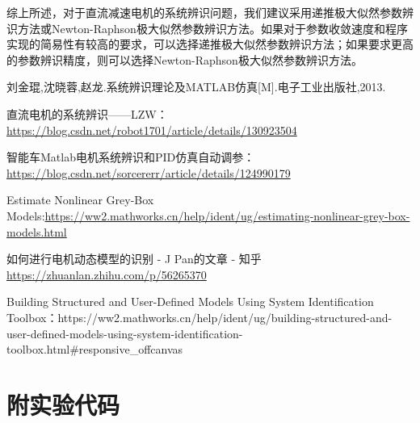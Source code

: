 \documentclass[UTF8, twocolumn]{article}
\begin{document}
综上所述，对于直流减速电机的系统辨识问题，我们建议采用递推极大似然参数辨识方法或Newton-Raphson极大似然参数辨识方法。如果对于参数收敛速度和程序实现的简易性有较高的要求，可以选择递推极大似然参数辨识方法；如果要求更高的参数辨识精度，则可以选择Newton-Raphson极大似然参数辨识方法。


\begin{thebibliography}{99}  
	 刘金琨,沈晓蓉,赵龙.系统辨识理论及MATLAB仿真[M].电子工业出版社,2013.

	 直流电机的系统辨识——LZW：\url{https://blog.csdn.net/robot1701/article/details/130923504}
	
	 智能车Matlab电机系统辨识和PID仿真自动调参：\url{https://blog.csdn.net/sorcererr/article/details/124990179}

	 Estimate Nonlinear Grey-Box Models:\url{https://ww2.mathworks.cn/help/ident/ug/estimating-nonlinear-grey-box-models.html}

	 如何进行电机动态模型的识别 - J Pan的文章 - 知乎\url{https://zhuanlan.zhihu.com/p/56265370}

	 Building Structured and User-Defined Models Using System Identification Toolbox：https://ww2.mathworks.cn/help/ident/ug/building-structured-and-user-defined-models-using-system-identification-toolbox.html\#responsive\_offcanvas

\end{thebibliography}


\onecolumn
%
\section*{附实验代码}
\end{document}
